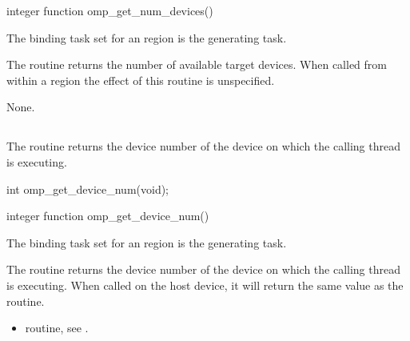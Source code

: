 \begin{fortranspecific}
\begin{ompfFunction}
integer function omp_get_num_devices()
\end{ompfFunction}
\end{fortranspecific}

\binding
The binding task set for an  region is the generating task.

\effect
The  routine returns the number of available target devices. 
When called from within a  region the effect of this routine is unspecified.

\crossreferences
None.











\subsection{}
\label{subsec:omp_get_device_num}
\summary
The  routine returns the device number of the device on which
the calling thread is executing.

\format
\begin{ccppspecific}
\begin{ompcFunction}
int omp_get_device_num(void);
\end{ompcFunction}
\end{ccppspecific}

\newpage %
\begin{fortranspecific}
\begin{ompfFunction}
integer function omp_get_device_num()
\end{ompfFunction}
\end{fortranspecific}

\binding
The binding task set for an  region is the generating task.

\effect
The  routine returns the device number of the device on which
the calling thread is executing. When called on the host device, it will return the same
value as the  routine.

\crossreferences
\begin{itemize}
\item {} routine, see
.
\end{itemize}










